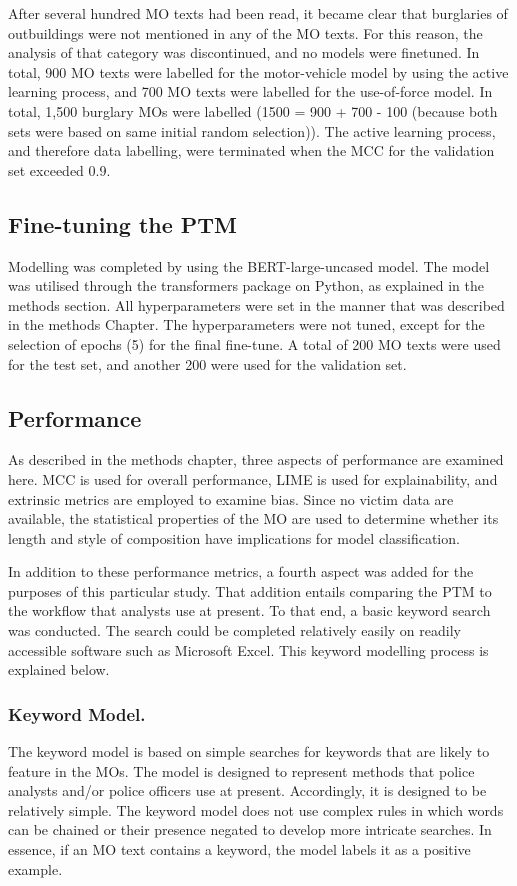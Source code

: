 After several hundred MO texts had been read, it became clear that burglaries of outbuildings were not mentioned in any of the MO texts. For this reason, the analysis of that category was discontinued, and no models were finetuned. In total, 900 MO texts were labelled for the motor-vehicle model by using the active learning process, and 700 MO texts were labelled for the use-of-force model. In total, 1,500 burglary MOs were labelled (1500 = 900 + 700 - 100 (because both sets were based on same initial random selection)). The active learning process, and therefore data labelling, were terminated when the MCC for the validation set exceeded 0.9.

\subsection{Fine-tuning the PTM} Modelling was completed by using the BERT-large-uncased model. The model was utilised through the transformers package on Python, as explained in the methods section. All hyperparameters were set in the manner that was described in the methods Chapter. The hyperparameters were not tuned, except for the selection of epochs (5) for the final fine-tune. A total of 200 MO texts were used for the test set, and another 200 were used for the validation set.

\subsection{Performance} As described in the methods chapter, three aspects of performance are examined here. MCC is used for overall performance, LIME is used for explainability,  and extrinsic metrics are employed to examine bias.  Since no victim data are available, the statistical properties of the MO are used to determine whether its length and style of composition have implications for model classification.

In addition to these performance metrics, a fourth aspect was added for the purposes of this particular study. That addition entails comparing the PTM to the workflow that analysts use at present. To that end, a basic keyword search was conducted. The search could be completed relatively easily on readily accessible software such as Microsoft Excel. This keyword modelling process is explained below.


\subsubsection{Keyword Model.} The keyword model is based on simple searches for keywords that are likely to feature in the MOs. The model is designed to represent methods that police analysts and/or police officers use at present. Accordingly, it is designed to be relatively simple. The keyword model does not use complex rules in which words can be chained or their presence negated to develop more intricate searches. In essence, if an MO text contains a keyword, the model labels it as a positive example.

